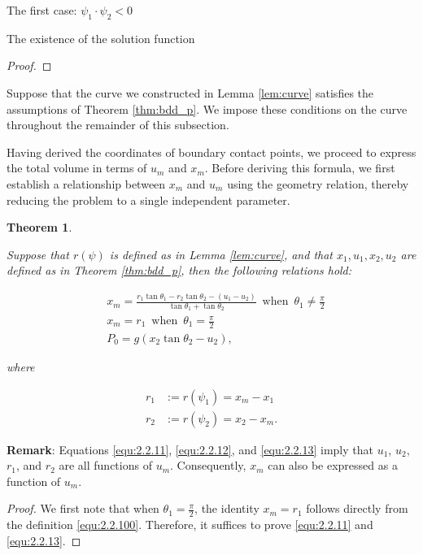 \documentclass[letterpaper,reqno,10pt,twoside]{amsart}
\newtheorem{theorem}{Theorem}[section]
\theoremstyle{definition}
\theoremstyle{remark}
\begin{document}
\begin{section}{The first case: $\psi_1\cdot \psi_2<0$ }
\begin{subsection}{The existence of the solution function}
\begin{proof}
    \end{proof}

     Suppose that the curve we constructed in Lemma \ref{lem:curve} satisfies the assumptions of Theorem \ref{thm:bdd_p}. We impose these conditions on the curve throughout the remainder of this subsection.
     
     Having derived the coordinates of boundary contact points, we proceed to express the total volume in terms of $u_{m}$ and $x_{m}$. Before deriving this formula, we first establish a relationship between $x_{m}$ and $u_{m}$ using the geometry relation, thereby reducing the problem to a single independent parameter.

    \begin{theorem}{\label{thm:relation}}

        Suppose that $r(\psi)$ is defined as in Lemma \ref{lem:curve}, and that $x_{1},u_{1},x_{2},u_{2}$ are defined as in Theorem \ref{thm:bdd_p}, then the following relations hold:

        \begin{align}
             &x_{m}=\frac{r_1\tan\theta_{1}-r_{2}\tan\theta_{2}-(u_1-u_{2})}{\tan\theta_{1}+\tan\theta_{2}}~\operatorname{when}~\theta_1\neq \frac{\pi}{2} \label{equ:2.2.11}\\
              &x_m=r_1~\operatorname{when}~\theta_1=\frac{\pi}{2} \label{equ:2.2.12}\\
               &P_{0}=g(x_{2}\tan\theta_2-u_{2}) \label{equ:2.2.13},
        \end{align}
        
        \noindent where

        \begin{align}
            r_1&:=r(\psi_1)=x_m-x_1 \label{equ:2.2.102}\\
             r_2&:=r(\psi_2)=x_2-x_m \label{equ:2.2.103}.
        \end{align}
        
    \end{theorem}

    \textbf{Remark}: Equations \eqref{equ:2.2.11}, \eqref{equ:2.2.12}, and \eqref{equ:2.2.13} imply that $u_1$, $u_2$, $r_1$, and $r_2$ are all functions of $u_{m}$. Consequently, $x_{m}$ can also be expressed as a function of $u_{m}$.
    
    \begin{proof}

        We first note that when $\theta_{1}=\frac{\pi}{2}$, the identity $x_{m}=r_{1}$ follows directly from the definition \eqref{equ:2.2.100}. Therefore, it suffices to prove \eqref{equ:2.2.11} and \eqref{equ:2.2.13}.
        

\end{proof}
\end{subsection}
\end{section}
\end{document}
